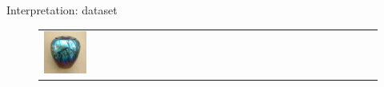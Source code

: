 \documentclass[10pt]{beamer}
\begin{document}
\begin{frame}{Interpretation: dataset}
\begin{figure}[!htbp]
\begin{tabular}{p{0.4cm}*{4}{c}}
\includegraphics[width=0.15\textwidth]{interp/real_world_img/vase/vase}
\end{tabular}
\end{figure}

\end{frame}
\end{document}
